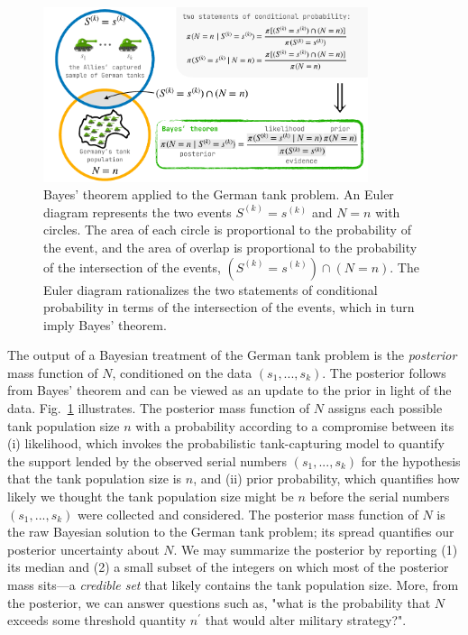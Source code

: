 \documentclass[11pt, oneside]{article}
\newcommand{\data}{$(s_1, ..., s_k)$\xspace}
\begin{document}
\begin{figure}[h!]
	\centering
	\includegraphics[width=0.85\textwidth]{gtp_fig0.pdf} 
	\caption{Bayes' theorem applied to the German tank problem. 
	An Euler diagram \cite{ottley2012visually,micallef2012assessing} represents the two events $S^{(k)}=s^{(k)}$ and $N=n$ with circles. The area of each circle is proportional to the probability of the event, and the area of overlap is proportional to the probability of the intersection of the events, $(S^{(k)}=s^{(k)}) \cap (N=n)$.
	The Euler diagram rationalizes the two statements of conditional probability in terms of the intersection of the events, which in turn imply Bayes' theorem. \cite{kruschke2014doing}
	} \label{fig:bayes}
\end{figure}

The output of a Bayesian treatment of the German tank problem is the \emph{posterior} mass function of $N$, conditioned on the data \data. The posterior follows from Bayes' theorem and can be viewed as an update to the prior in light of the data. Fig.~\ref{fig:bayes} illustrates.
The posterior mass function of $N$ assigns each possible tank population size $n$ with a probability according to a compromise between its
(i) likelihood, which invokes the probabilistic tank-capturing model to quantify the support lended by the observed serial numbers \data for the hypothesis that the tank population size is $n$, 
and 
(ii) prior probability, which quantifies how likely we thought the tank population size might be $n$ before the serial numbers \data were collected and considered. \cite{van2021bayesian} 
The posterior mass function of $N$ is the raw Bayesian solution to the German tank problem; its spread quantifies our posterior uncertainty about $N$. We may summarize the posterior by reporting (1) its median and (2) a small subset of the integers on which most of the posterior mass sits---a \emph{credible set} that likely contains the tank population size. More, from the posterior, we can answer questions such as, "what is the probability that $N$ exceeds some threshold quantity $n^\prime$ that would alter military strategy?".
\end{document}
